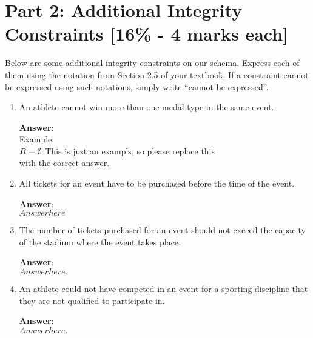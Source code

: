 \documentclass{article}
\begin{document}
\section*{Part 2: Additional Integrity Constraints [16\% - 4 marks each]}

Below are some additional integrity constraints on our schema. Express each of them
using the notation from Section 2.5 of your textbook. If a constraint cannot be
expressed using such notations, simply write ``cannot be expressed''.


\begin{enumerate}

\item   %
An athlete cannot win more than one medal type in the same event.

{\bf Answer}:\\[5pt]
{
Example:\\[5pt]
$
R = \emptyset\\[5pt]
$
This is just an exampls, so please replace this \\[5pt]
with the correct answer.
}

\item   %
All tickets for an event have to be purchased before the time of the event.

{\bf Answer}:\\[5pt]
{
$
Answer here
$
}


\item   %
The number of tickets purchased for an event should not exceed the capacity
of the stadium where the event takes place.

{\bf Answer}:\\[5pt]
{
$
Answer here.
$
}

\item   %
An athlete could not have competed in an event for a sporting discipline
that they are not qualified to participate in.

{\bf Answer}:\\[5pt]
{
$
Answer here.
$
}

\end{enumerate}
\end{document}
